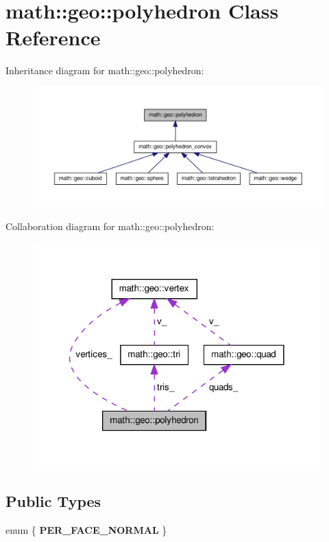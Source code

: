 \hypertarget{classmath_1_1geo_1_1polyhedron}{\section{math\-:\-:geo\-:\-:polyhedron \-Class \-Reference}
\label{classmath_1_1geo_1_1polyhedron}
}


\-Inheritance diagram for math\-:\-:geo\-:\-:polyhedron\-:\nopagebreak
\begin{figure}[H]
\begin{center}
\leavevmode
\includegraphics[width=350pt]{classmath_1_1geo_1_1polyhedron__inherit__graph}
\end{center}
\end{figure}


\-Collaboration diagram for math\-:\-:geo\-:\-:polyhedron\-:\nopagebreak
\begin{figure}[H]
\begin{center}
\leavevmode
\includegraphics[width=314pt]{classmath_1_1geo_1_1polyhedron__coll__graph}
\end{center}
\end{figure}
\subsection*{\-Public \-Types}
\begin{DoxyCompactItemize}
\item 
enum \{ {\bfseries \-P\-E\-R\-\_\-\-F\-A\-C\-E\-\_\-\-N\-O\-R\-M\-A\-L}
 \}
\end{DoxyCompactItemize}

